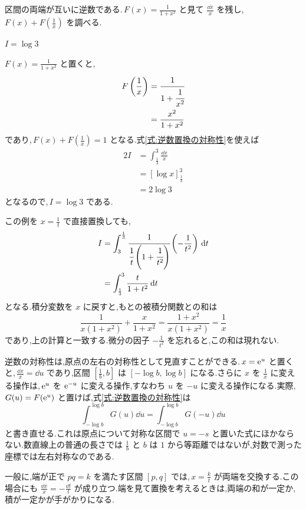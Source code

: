 区間の両端が互いに逆数である.\,$F(x)=\frac{1}{1+x^2}$ と見て $\frac{\dd x}{x}$ を残し,\,$F(x)+F\left(\frac1x\right)$ を調べる.

$I=\log3$

$F(x)=\frac{1}{1+x^2}$ と置くと,
\[
\begin{aligned}
F\left(\frac1x\right)&=\cfrac{1}{1+\cfrac{1}{x^2}}\\
 &=\frac{x^2}{1+x^2}
\end{aligned}
\]
であり,\,$F(x)+F\left(\frac1x\right)=1$ となる.式\eqref{式:逆数置換の対称性}を使えば
\[
\begin{aligned}
2I&=\int_{\frac13}^3\frac{\dd x}{x}\\
 &=\left[\log x\right]_{\frac13}^3\\
 &=2\log3
\end{aligned}
\]
となるので,\,$I=\log3$ である.

この例を $x=\frac1t$ で直接置換しても,
\[
\begin{aligned}
I&=\int_3^{\frac13}
\cfrac{1}{\cfrac1t\left(1+\cfrac1{t^2}\right)}
\left(-\frac{1}{t^2}\right)\,\mathrm{d} t\\
 &=\int_{\frac13}^3\frac{t}{1+t^2}\,\mathrm{d} t
\end{aligned}
\]
となる.積分変数を $x$ に戻すと,もとの被積分関数との和は
\[
\frac{1}{x(1+x^2)}+\frac{x}{1+x^2}
 =\frac{1+x^2}{x(1+x^2)}
 =\frac1x
\]
であり,上の計算と一致する.微分の因子 $-\frac{1}{t^2}$ を忘れると,この和は現れない.

逆数の対称性は,原点の左右の対称性として見直すことができる.\,$x=\mathrm{e}^u$ と置くと,\,$\frac{\dd x}{x}=\dd u$ であり,区間 $\left[\frac1b,b\right]$ は $[-\log b,\log b]$ になる.さらに $x$ を $\frac1x$ に変える操作は,\,$\mathrm{e}^u$ を $\mathrm{e}^{-u}$ に変える操作,すなわち $u$ を $-u$ に変える操作になる.実際,\,$G(u)=F(\mathrm{e}^u)$ と置けば,式\eqref{式:逆数置換の対称性}は
\[
\int_{-\log b}^{\log b}G(u)\dd u
 =\int_{-\log b}^{\log b}G(-u)\dd u
\]
と書き直せる.これは原点について対称な区間で $u=-s$ と置いた式にほかならない.数直線上の普通の長さでは $\frac1b$ と $b$ は $1$ から等距離ではないが,対数で測った座標では左右対称なのである.

一般に,端が正で $pq=k$ を満たす区間 $[p,q]$ では,\,$x=\frac{k}{t}$ が両端を交換する.この場合にも $\frac{\dd x}{x}=-\frac{\dd t}{t}$ が成り立つ.端を見て置換を考えるときは,両端の和が一定か,積が一定かが手がかりになる.
